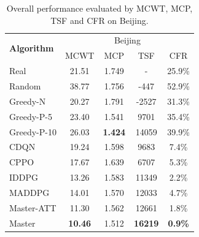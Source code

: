\documentclass[sigconf]{acmart}
\newcommand{\beijing}{{\sc Beijing}\xspace}
\newcommand{\stddpg}{{\sc Master}\xspace}
\begin{document}
\begin{table}[htb]
	\centering
	\caption{Overall performance evaluated by MCWT, MCP, TSF and CFR on \beijing.}
	\vspace{-2mm}
	\begin{tabular}{lcccc}
		\toprule[0.8pt]
		\multirow{2}{*}{\textbf{Algorithm}} & \multicolumn{4}{c}{\beijing} \\ \cline{2-5}
		& MCWT & MCP & TSF & CFR \\ 
        \midrule[0.5pt]
		Real &  21.51 & 1.749 & - & 25.9\%  \\
		Random &  38.77 & 1.756 & -447 & 52.9\% \\
		Greedy-N &  20.27 & 1.791 & -2527 & 31.3\% \\
		Greedy-P-5 &  23.40 & 1.541 & 9701 & 35.4\% \\
		Greedy-P-10 &  26.03 & \textbf{1.424} & 14059 & 39.9\% \\
		CDQN &  19.24 & 1.598 & 9683 & 7.4\% \\
		CPPO &  17.67 & 1.639 & 6707 & 5.3\% \\
		IDDPG &  13.26 & 1.583 & 11349 & 2.2\%\\
		MADDPG &  14.01 & 1.570 & 12033 & 4.7\% \\
        \midrule[0.5pt]
		\stddpg-ATT & 11.30 & 1.562 & 12661 & 1.8\% \\
		\stddpg & \textbf{10.46} & 1.512 & \textbf{16219} & \textbf{0.9\%} \\
        \bottomrule[0.5pt]
	\end{tabular}
	\label{table:overall_beijing}
\end{table}
\end{document}
